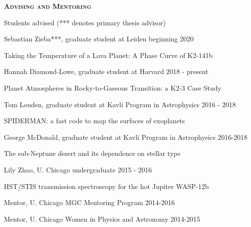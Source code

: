 \documentclass[12pt,letterpaper]{article}
\begin{document}
\vspace{7mm}
\textbf{\textsc{Advising and Mentoring}} 
\begin{compactitem}[]
\item Students advised  (*** denotes primary thesis advisor)
	\begin{compactitem}
        \item Sebastian Zieba***, graduate student at Leiden \hfill beginning 2020
		\begin{sloppypar}
		Taking the Temperature of a Lava Planet: A Phase Curve of K2-141b
		\end{sloppypar}
        \item Hannah Diamond-Lowe, graduate student at Harvard \hfill 2018 - present
		\begin{sloppypar}
		Planet Atmospheres in Rocky-to-Gaseous Transition: a K2-3 Case Study
		\end{sloppypar}
	\item Tom Louden, graduate student at Kavli Program in Astrophysics \hfill 2016 - 2018
		\begin{sloppypar}
		SPIDERMAN: a fast code to map the surfaces of exoplanets
		\end{sloppypar}
	\item George McDonald, graduate student at Kavli Program in Astrophysics \hfill 2016-2018
		\begin{sloppypar}
                 The sub-Neptune desert and its dependence on stellar type	
		\end{sloppypar}
	\item Lily Zhao, U. Chicago undergraduate \hfill 2015 - 2016
		\begin{sloppypar}
		HST/STIS transmission spectroscopy for the hot Jupiter WASP-12b
		\end{sloppypar}
	\end{compactitem}
\item Mentor, U. Chicago MGC Mentoring Program \hfill 2014-2016 
\item Mentor, U. Chicago Women in Physics and Astronomy \hfill2014-2015
\end{compactitem}
\end{document}
